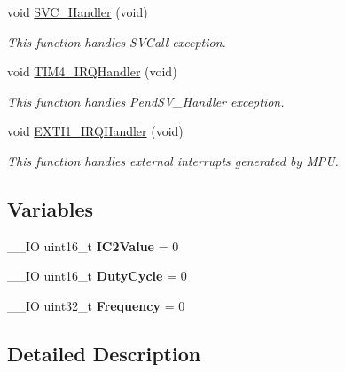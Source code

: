 \begin{DoxyCompactItemize}
void \hyperlink{group___t_i_m___p_w_m___input_ga3e5ddb3df0d62f2dc357e64a3f04a6ce}{S\+V\+C\+\_\+\+Handler} (void)
\begin{DoxyCompactList}\small\item\em This function handles S\+V\+Call exception. \end{DoxyCompactList}\item 
void \hyperlink{group___t_i_m___p_w_m___input_ga7133f3f78767503641d307386e68bd28}{T\+I\+M4\+\_\+\+I\+R\+Q\+Handler} (void)
\begin{DoxyCompactList}\small\item\em This function handles Pend\+S\+V\+\_\+\+Handler exception. \end{DoxyCompactList}\item 
void \hyperlink{group___t_i_m___p_w_m___input_ga49cfdd46eb8d0ef3e1987514aa9343dc}{E\+X\+T\+I1\+\_\+\+I\+R\+Q\+Handler} (void)
\begin{DoxyCompactList}\small\item\em This function handles external interrupts generated by M\+P\+U. \end{DoxyCompactList}\end{DoxyCompactItemize}
\subsection*{Variables}
\begin{DoxyCompactItemize}
\item 
\hypertarget{group___t_i_m___p_w_m___input_gabd99ab05d2b4fa0a6cdda7f7025f1c0f}{}\+\_\+\+\_\+\+I\+O uint16\+\_\+t {\bfseries I\+C2\+Value} = 0\label{group___t_i_m___p_w_m___input_gabd99ab05d2b4fa0a6cdda7f7025f1c0f}

\item 
\hypertarget{group___t_i_m___p_w_m___input_gab9dc41d132c0c4158a03bf7c66051f46}{}\+\_\+\+\_\+\+I\+O uint16\+\_\+t {\bfseries Duty\+Cycle} = 0\label{group___t_i_m___p_w_m___input_gab9dc41d132c0c4158a03bf7c66051f46}

\item 
\hypertarget{group___t_i_m___p_w_m___input_gacde10dfe8fee7fed60803ec1a7d6dd39}{}\+\_\+\+\_\+\+I\+O uint32\+\_\+t {\bfseries Frequency} = 0\label{group___t_i_m___p_w_m___input_gacde10dfe8fee7fed60803ec1a7d6dd39}

\end{DoxyCompactItemize}


\subsection{Detailed Description}


